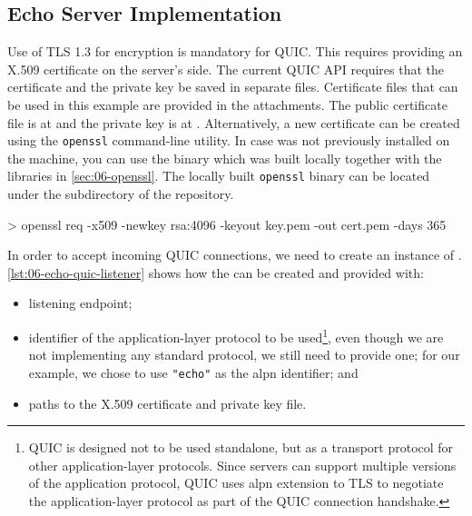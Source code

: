 \subsection{Echo Server Implementation}

Use of TLS 1.3 for encryption is mandatory for QUIC\@. This requires providing an X.509 certificate
on the server's side. The current QUIC API requires that the certificate and the private key be
saved in separate files. Certificate files that can be used in this example are provided in the
attachments. The public certificate file is at  and the private key is at
. Alternatively, a new certificate can be created using the
\texttt{openssl} command-line utility. In case \libopenssl{} was not previously installed on the
machine, you can use the binary which was built locally together with the libraries in
\autoref{sec:06-openssl}. The locally built \texttt{openssl} binary can be located under the
 subdirectory of the \libopenssl{} repository.

\begin{myVerbatim}
> openssl req -x509 -newkey rsa:4096 -keyout key.pem -out cert.pem -days 365
\end{myVerbatim}

In order to accept incoming QUIC connections, we need to create an instance of \QuicListener{}.
\autoref{lst:06-echo-quic-listener} shows how the \QuicListener{} can be created and provided with:

\begin{itemize}

  \item listening endpoint;

  \item identifier of the application-layer protocol to be used\footnote{QUIC is designed not to be
        used standalone, but as a transport protocol for other application-layer protocols. Since
        servers can support multiple versions of the application protocol, QUIC uses \gls{alpn}
        extension to TLS to negotiate the application-layer protocol as part of the QUIC connection
        handshake.}, even though we are not implementing any standard protocol, we still need to
        provide one; for our example, we chose to use \texttt{"echo"} as the \gls{alpn} identifier;
        and

  \item paths to the X.509 certificate and private key file.

\end{itemize}

